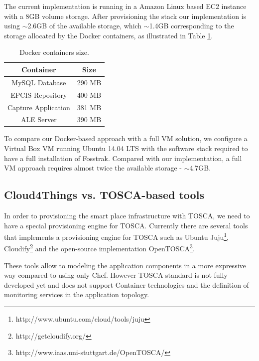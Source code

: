 The current implementation is running in a Amazon Linux based EC2 instance with a 8GB volume storage.
After provisioning the stack our implementation is using $\sim$2.6GB of the available storage, which $\sim$1.4GB
corresponding to the storage allocated by the Docker containers, as illustrated in Table \ref{table:containers_size}.

\begin{table}[h]
\centering
\begin{tabular}{|c|c|}
\hline
\multicolumn{1}{|c|}{Container} & \multicolumn{1}{c|}{Size} \\ \hline
MySQL Database                  & 290 MB                    \\ \hline
EPCIS Repository                & 400 MB                    \\ \hline
Capture Application             & 381 MB                    \\ \hline
ALE Server                      & 390 MB                    \\ \hline
\end{tabular}
\caption{Docker containers size.}
\label{table:containers_size}
\end{table}

To compare our Docker-based approach with a full VM solution, we configure a Virtual Box VM running
Ubuntu 14.04 LTS with the software stack required to have a full installation of Fosstrak. Compared
with our implementation, a full VM approach requires almost twice the available storage - $\sim$4.7GB.

\subsection{Cloud4Things vs. TOSCA-based tools}
\label{sub:c4t_vs_tosca}

In order to provisioning the smart place infrastructure with TOSCA, we need to have a special
provisioning engine for TOSCA. Currently there are several tools that implements
a provisioning engine for TOSCA such as Ubuntu Juju\footnote{http://www.ubuntu.com/cloud/tools/juju},
Cloudify\footnote{http://getcloudify.org/} and the open-source implementation
OpenTOSCA\footnote{http://www.iaas.uni-stuttgart.de/OpenTOSCA/}.

These tools allow to modeling the application components in a more expressive way compared to using
only Chef. However TOSCA standard is not fully developed yet and does not support Container
technologies and the definition of monitoring services in the application topology.
